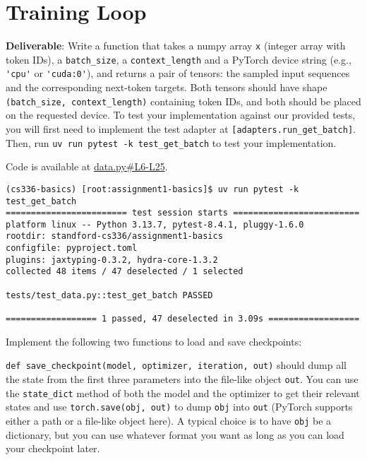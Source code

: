 \section{Training Loop}


\textbf{Deliverable}: Write a function that takes a numpy array \lstinline{x} (integer array with token IDs), a \lstinline{batch_size}, a \lstinline{context_length} and a PyTorch device string (e.g., \lstinline{'cpu'} or \lstinline{'cuda:0'}), and returns a pair of tensors: the sampled input sequences and the corresponding next-token targets. Both tensors should have shape \lstinline{(batch_size, context_length)} containing token IDs, and both should be placed on the requested device. To test your implementation against our provided tests, you will first need to implement the test adapter at \lstinline{[adapters.run_get_batch]}. Then, run \lstinline{uv run pytest -k test_get_batch} to test your implementation.

\begin{answer}
    Code is available at \href{https://github.com/donglinkang2021/cs336-assignment1-basics/blob/main/cs336_basics/data.py#L6-L25}{data.py\#L6-L25}.
\end{answer}

\begin{lstlisting}
(cs336-basics) [root:assignment1-basics]$ uv run pytest -k test_get_batch
======================== test session starts =========================
platform linux -- Python 3.13.7, pytest-8.4.1, pluggy-1.6.0
rootdir: standford-cs336/assignment1-basics
configfile: pyproject.toml
plugins: jaxtyping-0.3.2, hydra-core-1.3.2
collected 48 items / 47 deselected / 1 selected                      

tests/test_data.py::test_get_batch PASSED

================== 1 passed, 47 deselected in 3.09s ==================
\end{lstlisting}


Implement the following two functions to load and save checkpoints:

\texttt{def save\_checkpoint(model, optimizer, iteration, out)} should dump all the state from the first three parameters into the file-like object \texttt{out}. You can use the \texttt{state\_dict} method of both the model and the optimizer to get their relevant states and use \texttt{torch.save(obj, out)} to dump \texttt{obj} into \texttt{out} (PyTorch supports either a path or a file-like object here). A typical choice is to have \texttt{obj} be a dictionary, but you can use whatever format you want as long as you can load your checkpoint later.

